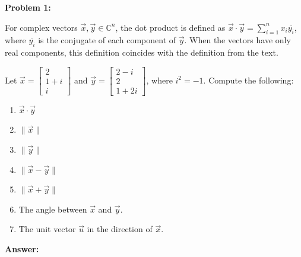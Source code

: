 \documentclass[10pt,letterpaper,final]{report}
\newcommand{\C}{\mathbb{C}}
\newcommand{\norm}[1]{\|#1\|}
\begin{document}
\begin{center}
  \vline
\end{center}

\medskip
\noindent\textbf{Problem 1:}
\medskip

For complex vectors $\vec{x}, \vec{y} \in \C^n$, the dot product is defined as $\vec{x} \cdot \vec{y} = \sum_{i=1}^{n} x_i\overline{y_i}$, where $\overline{y_i}$ is the conjugate of each component of $\vec{y}$. When the vectors have only real components, this definition coincides with the definition from the text.

Let $\vec{x} = \begin{bmatrix}
    2     \\
    1 + i \\
    i
  \end{bmatrix}$ and $\vec{y} = \begin{bmatrix}
    2 - i \\
    2     \\
    1 + 2i
  \end{bmatrix}$, where $i^2 = -1$. Compute the following:

\begin{enumerate}[label=(\alph*)]
  \item $\vec{x} \cdot \vec{y}$
  \item $\norm{\vec{x}}$
  \item $\norm{\vec{y}}$
  \item $\norm{\vec{x} - \vec{y}}$
  \item $\norm{\vec{x} + \vec{y}}$
  \item The angle between $\vec{x}$ and $\vec{y}$.
  \item The unit vector $\vec{u}$ in the direction of $\vec{x}$.
\end{enumerate}

\medskip
\noindent\textbf{Answer:}
\end{document}
